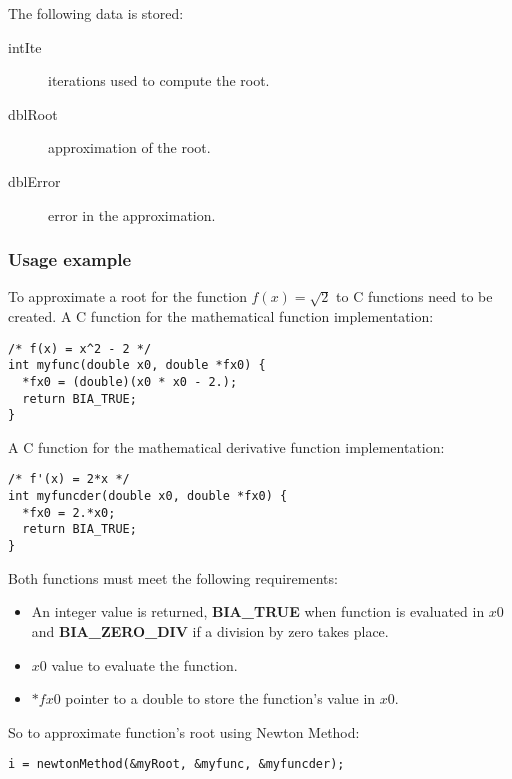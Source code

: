 %
The following data is stored:
%
\begin{description}
\item[intIte] iterations used to compute the root.
\item[dblRoot] approximation of the root.
\item[dblError] error in the approximation.
\end{description}
%

\subsubsection{Usage example}

To approximate a root for the function $f(x) = \sqrt{2}$ to C functions need to be created. A C function for the mathematical function implementation:
%
\begin{verbatim}
/* f(x) = x^2 - 2 */
int myfunc(double x0, double *fx0) {
  *fx0 = (double)(x0 * x0 - 2.);
  return BIA_TRUE;
}  
\end{verbatim}
%
A C function for the mathematical derivative function implementation:
%
\begin{verbatim}
/* f'(x) = 2*x */
int myfuncder(double x0, double *fx0) {
  *fx0 = 2.*x0;
  return BIA_TRUE;
}  
\end{verbatim}
%
Both functions must meet the following requirements:
%
\begin{itemize}
\item An integer value is returned, \textbf{BIA\_TRUE} when function is evaluated in $x0$ and \textbf{BIA\_ZERO\_DIV} if a division by zero takes place.
\item $x0$ value to evaluate the function.
\item $*fx0$ pointer to a double to store the function's value in $x0$.
\end{itemize}
%
So to approximate function's root using Newton Method:
%
\begin{verbatim}
i = newtonMethod(&myRoot, &myfunc, &myfuncder);  
\end{verbatim}

